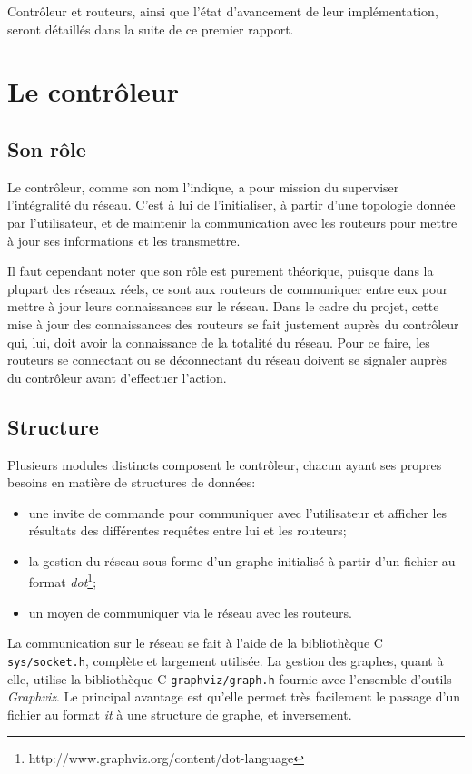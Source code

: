 \documentclass[a4paper,11pt]{article}
\begin{document}
Contrôleur et routeurs, ainsi que l'état d'avancement de leur implémentation, seront détaillés dans la suite de ce premier rapport.

\section{Le contrôleur}

\subsection{Son rôle}

Le contrôleur, comme son nom l'indique, a pour mission du superviser l'intégralité du réseau. C'est à lui de l'initialiser, à partir d'une topologie donnée par l'utilisateur, et de maintenir la communication avec les routeurs pour mettre à jour ses informations et les transmettre.

Il faut cependant noter que son rôle est purement théorique, puisque dans la plupart des réseaux réels, ce sont aux routeurs de communiquer entre eux pour mettre à jour leurs connaissances sur le réseau. Dans le cadre du projet, cette mise à jour des connaissances des routeurs se fait justement auprès du contrôleur qui, lui, doit avoir la connaissance de la totalité du réseau. Pour ce faire, les routeurs se connectant ou se déconnectant du réseau doivent se signaler auprès du contrôleur avant d'effectuer l'action.

\subsection{Structure}

Plusieurs modules distincts composent le contrôleur, chacun ayant ses propres besoins en matière de structures de données:
\begin{itemize}
  \item une invite de commande pour communiquer avec l'utilisateur et afficher les résultats des différentes requêtes entre lui et les routeurs;
  \item la gestion du réseau sous forme d'un graphe initialisé à partir d'un fichier au format \textit{dot}\footnote{http://www.graphviz.org/content/dot-language};
  \item un moyen de communiquer via le réseau avec les routeurs.
\end{itemize}

La communication sur le réseau se fait à l'aide de la bibliothèque C \texttt{sys/socket.h}, complète et largement utilisée. La gestion des graphes, quant à elle, utilise la bibliothèque C \texttt{graphviz/graph.h} fournie avec l'ensemble d'outils \textit{Graphviz}. Le principal avantage est qu'elle permet très facilement le passage d'un fichier au format \textit{it} à une structure de graphe, et inversement.
\end{document}
